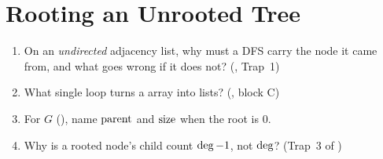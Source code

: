 \section{Rooting an Unrooted Tree}\label{sec:c04-rooting}

\begin{previouslybox}
\begin{enumerate}[nosep, leftmargin=1.6em]
  \item On an \emph{undirected} adjacency list, why must a DFS carry the node it came
        from, and what goes wrong if it does not? (, Trap~1)
  \item What single loop turns a  array into  lists?
        (, block C)
  \item For $G$ (), name $\operatorname{parent}$ and $\operatorname{size}$ when the root is $0$.
  \item Why is a rooted node's child count $\operatorname{deg} - 1$, not $\operatorname{deg}$? (Trap~3 of )
\end{enumerate}
\end{previouslybox}

